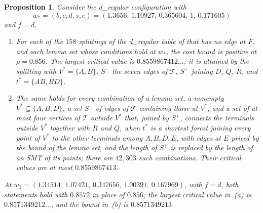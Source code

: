 \documentclass[11pt]{amsart}
\newtheorem{proposition}[theorem]{Proposition}
\theoremstyle{definition}
\theoremstyle{remark}
\numberwithin{equation}{section}
\newcommand{\NCOMBO}{42{,}303}
\begin{document}
\begin{proposition}\label{prop:cap}
Consider the d\_regular configuration with
\[
w_*=(b,c,d,s,e)=(1.3656,\,1.10927,\,0.365604,\,1,\,0.171605)
\]
and $f=d$.
\begin{enumerate}[label=\textup{(\alph*)}]
\item For each of the $158$ splittings of the d\_regular table of \cite{KHSHGW} that has no edge at $F$, and each lemma set whose conditions hold at $w_*$, the cost bound is positive at $\rho=0.856$. The largest critical value is $0.8559867412\ldots$; it is attained by the splitting with $V^*=\{A,B\}$, $S^-$ the seven edges of $\mathcal T$, $S^+$ joining $D$, $Q$, $R$, and $t^*=\{AB,BD\}$.
\item The same holds for every combination of a lemma set, a nonempty $V^*\subseteq\{A,B,D\}$, a set $S^-$ of edges of $\mathcal T$ containing those at $V^*$, and a set of at most four vertices of $\mathcal T$ outside $V^*$ that, joined by $S^+$, connects the terminals outside $V^*$ together with $R$ and $Q$, when $t^*$ is a shortest forest joining every point of $V^*$ to the other terminals among $A,B,D,E$, with edges at $E$ priced by the bound of the lemma set, and the length of $S^+$ is replaced by the length of an SMT of its points; there are $\NCOMBO$ such combinations. Their critical values are at most $0.8559867413$.
\end{enumerate}
At $w_1=(1.34514,\,1.07421,\,0.347656,\,1.00391,\,0.167969)$, with $f=d$, both statements hold with $0.8572$ in place of $0.856$; the largest critical value in~\textup{(a)} is $0.8571349212\ldots$, and the bound in~\textup{(b)} is $0.8571349213$.
\end{proposition}
\end{document}
